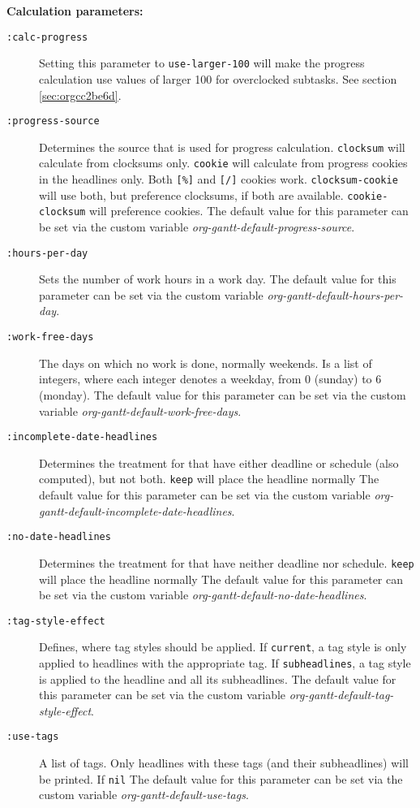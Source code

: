 \documentclass[11pt]{article}
\begin{document}
\noindent
\textbf{Calculation parameters:}
\begin{description}
\item[{\texttt{:calc-progress}}] Setting this parameter to \texttt{use-larger-100} will make the progress calculation use values of larger 100 for overclocked subtasks. See section \ref{sec:orgcc2be6d}.
\item[{\texttt{:progress-source}}] Determines the source that is used for progress calculation. \texttt{clocksum} will calculate from clocksums only. \texttt{cookie} will calculate from progress cookies in the headlines only. Both \texttt{[\%]} and \texttt{[/]} cookies work. \texttt{clocksum-cookie} will use both, but preference clocksums, if both are available. \texttt{cookie-clocksum} will preference cookies. The default value for this parameter can be set via the custom variable \emph{org-gantt-default-progress-source}.
\item[{\texttt{:hours-per-day}}] Sets the number of work hours in a work day. The default value for this parameter can be set via the custom variable \emph{org-gantt-default-hours-per-day}.
\item[{\texttt{:work-free-days}}] The days on which no work is done, normally weekends. Is a list of integers, where each integer denotes a weekday, from 0 (sunday) to 6 (monday). The default value for this parameter can be set via the custom variable \emph{org-gantt-default-work-free-days}.
\item[{\texttt{:incomplete-date-headlines}}] Determines the treatment for that have either deadline or schedule (also computed), but not both. \texttt{keep} will place the headline normally The default value for this parameter can be set via the custom variable \emph{org-gantt-default-incomplete-date-headlines}.
\item[{\texttt{:no-date-headlines}}] Determines the treatment for that have neither deadline nor schedule. \texttt{keep} will place the headline normally The default value for this parameter can be set via the custom variable \emph{org-gantt-default-no-date-headlines}.
\item[{\texttt{:tag-style-effect}}] Defines, where tag styles should be applied. If \texttt{current}, a tag style is only applied to headlines with the appropriate tag. If \texttt{subheadlines}, a tag style is applied to the headline and all its subheadlines. The default value for this parameter can be set via the custom variable \emph{org-gantt-default-tag-style-effect}.
\item[{\texttt{:use-tags}}] A list of tags. Only headlines with these tags (and their subheadlines) will be printed. If \texttt{nil} The default value for this parameter can be set via the custom variable \emph{org-gantt-default-use-tags}.

\end{description}
\end{document}

